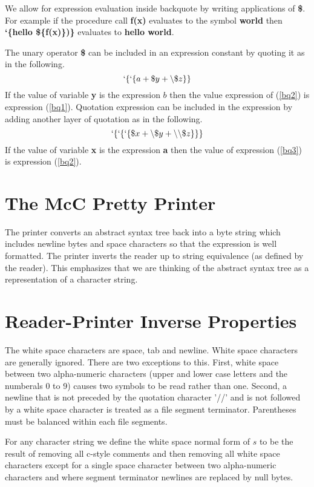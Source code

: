 \documentclass{article}
\begin{document}
We allow for expression evaluation inside backquote by writing applications of {\bf \$}.  For example if the procedure call {\bf f(x)} evaluates to the symbol {\bf world} then
{\bf `\{hello \$\{f(x)\})\}} evaluates to {\bf hello world}.

The unary operator {\bf \$} can be included in an expression constant by quoting it as in the following.
\begin{equation}
\label{bq2}
`\{`\{a + \$y + \backslash\$z\}\}
\end{equation}
If the value of variable {\bf y} is the expression $b$ then the value expression of (\ref{bq2}) is expression (\ref{bq1}).
Quotation expression can be included in the expression by adding another layer of quotation as in the following.
\begin{equation}
\label{bq3}
`\{`\{`\{\$x + \backslash\$y + \backslash\backslash\$z\}\}\}
\end{equation}
If the value of variable {\bf x} is the expression {\bf a} then the value of expression (\ref{bq3}) is expression (\ref{bq2}).


\section{The McC Pretty Printer}

The printer converts an abstract syntax tree back into a byte string which includes newline bytes and space characters
so that the expression is well formatted. The printer inverts the reader up to string equivalence (as defined by the reader).
This emphasizes that we are thinking of the abstract syntax tree as a representation of a character string.

\section{Reader-Printer Inverse Properties}

The white space characters are space, tab and newline.  White space characters are generally ignored.  There are two exceptions to this.
First, white space between two alpha-numeric characters (upper and lower case letters and the numberals 0 to 9) causes two symbols to be read rather than one.
Second, a newline that is not preceded by the quotation character '//' and is not followed by a white space character is
treated as a file segment terminator.  Parentheses must be balanced within each file segments.

For any character string we define the white space normal form of $s$
to be the result of removing all c-style comments and then removing all white space characters except for
a single space character between two alpha-numeric characters and where segment terminator newlines
are replaced by null bytes.
\end{document}
